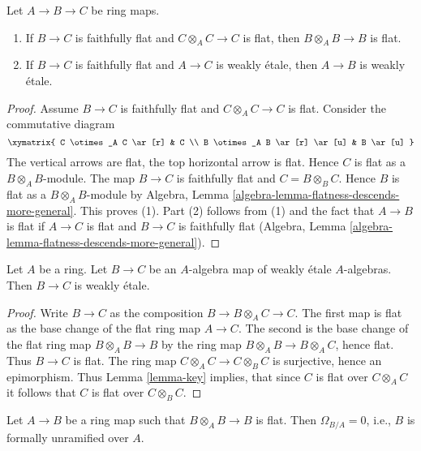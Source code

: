 \begin{lemma}
\label{lemma-go-down}
Let $A \to B \to C$ be ring maps.
\begin{enumerate}
\item If $B \to C$ is faithfully flat and $C \otimes_A C \to C$ is flat,
then $B \otimes_A B \to B$ is flat.
\item If $B \to C$ is faithfully flat and $A \to C$ is weakly \'etale,
then $A \to B$ is weakly \'etale.
\end{enumerate}
\end{lemma}

\begin{proof}
Assume $B \to C$ is faithfully flat and $C \otimes_A C \to C$ is flat.
Consider the commutative diagram
$$
\xymatrix{
C \otimes_A C \ar[r] & C \\
B \otimes_A B \ar[r] \ar[u] & B \ar[u]
}
$$
The vertical arrows are flat, the top horizontal arrow is flat.
Hence $C$ is flat as a $B \otimes_A B$-module. The map $B \to C$ is
faithfully flat and $C = B \otimes_B C$. Hence $B$ is flat as a
$B \otimes_A B$-module by
Algebra, Lemma \ref{algebra-lemma-flatness-descends-more-general}.
This proves (1). Part (2) follows from (1) and the fact that
$A \to B$ is flat if $A \to C$ is flat and $B \to C$ is faithfully flat
(Algebra, Lemma \ref{algebra-lemma-flatness-descends-more-general}).
\end{proof}

\begin{lemma}
\label{lemma-weakly-etale-permanence}
Let $A$ be a ring. Let $B \to C$ be an $A$-algebra map of weakly \'etale
$A$-algebras. Then $B \to C$ is weakly \'etale.
\end{lemma}

\begin{proof}
Write $B \to C$ as the composition $B \to B \otimes_A C \to C$.
The first map is flat as the base change of the flat ring map $A \to C$.
The second is the base change of the flat ring map $B \otimes_A B \to B$
by the ring map $B \otimes_A B \to B \otimes_A C$, hence flat.
Thus $B \to C$ is flat. The ring map
$C \otimes_A C \to C \otimes_B C$ is surjective, hence an epimorphism.
Thus Lemma \ref{lemma-key} implies, that since
$C$ is flat over $C \otimes_A C$ it follows that $C$ is
flat over $C \otimes_B C$.
\end{proof}

\begin{lemma}
\label{lemma-formally-unramified}
Let $A \to B$ be a ring map such that $B \otimes_A B \to B$ is flat.
Then $\Omega_{B/A} = 0$, i.e., $B$ is formally unramified over $A$.
\end{lemma}

